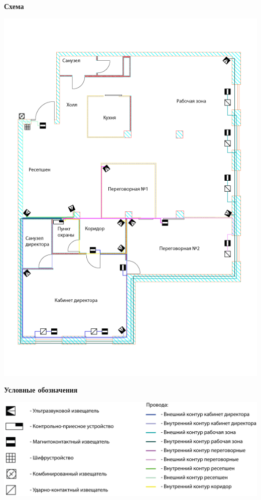 \documentclass[a4paper,14pt]{extarticle}
\begin{document}
    \begin{center}
        \textbf{Схема}
    \end{center}
    \vspace{-6ex}
    \begin{center}
        \includegraphics[scale=0.65, angle=90]{pics/Sensors.png}
    \end{center}
    \newpage
    \textbf{Условные обозначения}
    \begin{center}
        \includegraphics[scale=0.65]{pics/Sensors(mark).png}
    \end{center}
\end{document}
